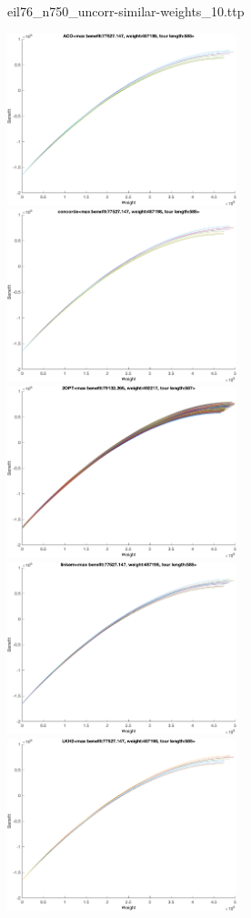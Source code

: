 \documentclass{article}
\begin{document}
\newpage
eil76\_n750\_uncorr-similar-weights\_10.ttp

\noindent
\includegraphics[width=0.5\textwidth]{eil76figs/eil76_n750_uncorr-similar-weights_10.ttp.aco.txt.eps}
\includegraphics[width=0.5\textwidth]{eil76figs/eil76_n750_uncorr-similar-weights_10.ttp.con.txt.eps}
\includegraphics[width=0.5\textwidth]{eil76figs/eil76_n750_uncorr-similar-weights_10.ttp.inv.txt.eps}
\includegraphics[width=0.5\textwidth]{eil76figs/eil76_n750_uncorr-similar-weights_10.ttp.lkh.txt.eps}
\includegraphics[width=0.5\textwidth]{eil76figs/eil76_n750_uncorr-similar-weights_10.ttp.lkh2.txt.eps}


% 
%  
\end{document}
